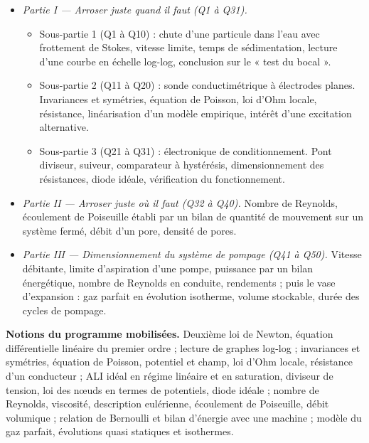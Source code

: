 \documentclass[11pt,a4paper]{article}
\providecommand{\tightlist}{\setlength{\itemsep}{0pt}\setlength{\parskip}{0pt}}
\begin{document}
\begin{itemize}
\tightlist
\item
  \emph{Partie I --- Arroser juste quand il faut (Q1 à Q31).}

  \begin{itemize}
  \tightlist
  \item
    Sous-partie 1 (Q1 à Q10) : chute d'une particule dans l'eau avec frottement de Stokes, vitesse limite, temps de sédimentation, lecture d'une courbe en échelle log-log, conclusion sur le « test du bocal ».
  \item
    Sous-partie 2 (Q11 à Q20) : sonde conductimétrique à électrodes planes. Invariances et symétries, équation de Poisson, loi d'Ohm locale, résistance, linéarisation d'un modèle empirique, intérêt d'une excitation alternative.
  \item
    Sous-partie 3 (Q21 à Q31) : électronique de conditionnement. Pont diviseur, suiveur, comparateur à hystérésis, dimensionnement des résistances, diode idéale, vérification du fonctionnement.
  \end{itemize}
\item
  \emph{Partie II --- Arroser juste où il faut (Q32 à Q40).} Nombre de Reynolds, écoulement de Poiseuille établi par un bilan de quantité de mouvement sur un système fermé, débit d'un pore, densité de pores.
\item
  \emph{Partie III --- Dimensionnement du système de pompage (Q41 à Q50).} Vitesse débitante, limite d'aspiration d'une pompe, puissance par un bilan énergétique, nombre de Reynolds en conduite, rendements ; puis le vase d'expansion : gaz parfait en évolution isotherme, volume stockable, durée des cycles de pompage.
\end{itemize}

\textbf{Notions du programme mobilisées.} Deuxième loi de Newton, équation différentielle linéaire du premier ordre ; lecture de graphes log-log ; invariances et symétries, équation de Poisson, potentiel et champ, loi d'Ohm locale, résistance d'un conducteur ; ALI idéal en régime linéaire et en saturation, diviseur de tension, loi des nœuds en termes de potentiels, diode idéale ; nombre de Reynolds, viscosité, description eulérienne, écoulement de Poiseuille, débit volumique ; relation de Bernoulli et bilan d'énergie avec une machine ; modèle du gaz parfait, évolutions quasi statiques et isothermes.
\end{document}
